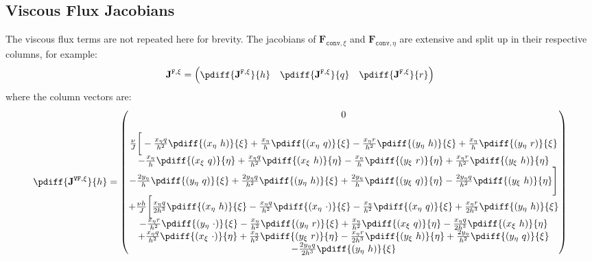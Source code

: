 \subsection{Viscous Flux Jacobians}
The viscous flux terms are not repeated here for brevity.
The jacobians of $\mathbf{F}_{\texttt{conv},\xi}$ and $\mathbf{F}_{\texttt{conv},\eta}$ are extensive and split up in their respective columns, for example:
%
\begin{align}
	\mathbf{J}^{\texttt{F},\xi} = \Big(
	\pdiff{\mathbf{J}^{\texttt{F},\xi}}{h} \quad
	\pdiff{\mathbf{J}^{\texttt{F},\xi}}{q} \quad
	\pdiff{\mathbf{J}^{\texttt{F},\xi}}{r}\Big)
\end{align}
%
where the column vectors are:
%
\begin{align}
	\pdiff{\mathbf{J}^{\texttt{VF},\xi}}{h}=
		\begin{pmatrix}
	0 \\
	\\
	\frac{\nu}{J} \bigg[
		-\frac{x_{\eta} q}{h^2}\pdiff{(x_{\eta}\ h)}{\xi}
		+ \frac{x_{\eta}}{h} \pdiff{(x_{\eta}\ q)}{\xi}
		- \frac{x_{\eta}r}{h^2} \pdiff{(y_{\eta}\ h)}{\xi}
		+ \frac{x_{\eta}}{h} \pdiff{(y_{\eta}\ r)}{\xi}\\
		- \frac{x_{\eta} }{h} \pdiff{(x_{\xi}\ q)}{\eta}
		+ \frac{x_{\eta} q}{h^2} \pdiff{ (x_{\xi}\ h)}{\eta}
		- \frac{x_{\eta} }{h} \pdiff{(y_{\xi}\ r)}{\eta}
		+ \frac{x_{\eta} r}{h^2} \pdiff{ (y_{\xi}\ h)}{\eta}\\
		- \frac{2 y_{\eta}}{h}  \pdiff{ (y_{\eta}\ q)}{\xi}
		+ \frac{2 y_{\eta} q }{h^2}  \pdiff{ (y_{\eta}\ h)}{\xi}
		+ \frac{2 y_{\eta}}{h}  \pdiff{(y_{\xi}\ q)}{\eta}
		- \frac{2 y_{\eta} q}{h^2} \pdiff{(y_{\xi}\ h)}{\eta}\Bigg]\\
	+\frac{\nu h}{J} \bigg[
		\frac{x_{\eta} q}{2h^3}\pdiff{(x_{\eta}\ h)}{\xi}
		-\frac{x_{\eta} q}{h^2}\pdiff{(x_{\eta}\ \cdot)}{\xi}
		- \frac{x_{\eta}}{h^2} \pdiff{(x_{\eta}\ q)}{\xi}
		+ \frac{x_{\eta}r}{2h^3} \pdiff{(y_{\eta}\ h)}{\xi} \\
		- \frac{x_{\eta}r}{h^2} \pdiff{(y_{\eta}\ \cdot)}{\xi}
		- \frac{x_{\eta}}{h^2} \pdiff{(y_{\eta}\ r)}{\xi}
		+ \frac{x_{\eta} }{h^2} \pdiff{(x_{\xi}\ q)}{\eta}
		- \frac{x_{\eta} q}{2h^3} \pdiff{ (x_{\xi}\ h)}{\eta}\\
		+ \frac{x_{\eta} q}{h^2} \pdiff{ (x_{\xi}\ \cdot)}{\eta}
		+ \frac{x_{\eta} }{h^2} \pdiff{(y_{\xi}\ r)}{\eta}
		- \frac{x_{\eta} r}{2h^3} \pdiff{ (y_{\xi}\ h)}{\eta}
		+ \frac{2 y_{\eta}}{h^2}  \pdiff{ (y_{\eta}\ q)}{\xi} \\
		- \frac{2 y_{\eta} q }{2h^3}  \pdiff{ (y_{\eta}\ h)}{\xi}

\end{pmatrix}
\end{align}
